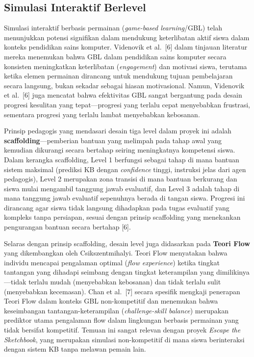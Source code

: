 \documentclass[12pt,oneside]{report}
\begin{document}
\subsection{Simulasi Interaktif Berlevel}
\label{subsec:simulasi-interaktif}

Simulasi interaktif berbasis permainan (\textit{game-based learning}/GBL) telah menunjukkan potensi signifikan dalam mendukung keterlibatan aktif siswa dalam konteks pendidikan sains komputer. Videnovik et al.\ [6] dalam tinjauan literatur mereka menemukan bahwa GBL dalam pendidikan sains komputer secara konsisten meningkatkan keterlibatan (\textit{engagement}) dan motivasi siswa, terutama ketika elemen permainan dirancang untuk mendukung tujuan pembelajaran secara langsung, bukan sekadar sebagai hiasan motivasional. Namun, Videnovik et al.\ [6] juga mencatat bahwa efektivitas GBL sangat bergantung pada desain progresi kesulitan yang tepat---progresi yang terlalu cepat menyebabkan frustrasi, sementara progresi yang terlalu lambat menyebabkan kebosanan.

Prinsip pedagogis yang mendasari desain tiga level dalam proyek ini adalah \textbf{scaffolding}---pemberian bantuan yang melimpah pada tahap awal yang kemudian dikurangi secara bertahap seiring meningkatnya kompetensi siswa. Dalam kerangka scaffolding, Level 1 berfungsi sebagai tahap di mana bantuan sistem maksimal (prediksi KB dengan \textit{confidence} tinggi, instruksi jelas dari agen pedagogis), Level 2 merupakan zona transisi di mana bantuan berkurang dan siswa mulai mengambil tanggung jawab evaluatif, dan Level 3 adalah tahap di mana tanggung jawab evaluatif sepenuhnya berada di tangan siswa. Progresi ini dirancang agar siswa tidak langsung dihadapkan pada tugas evaluatif yang kompleks tanpa persiapan, sesuai dengan prinsip scaffolding yang menekankan pengurangan bantuan secara bertahap [6].

Selaras dengan prinsip scaffolding, desain level juga didasarkan pada \textbf{Teori Flow} yang dikembangkan oleh Csikszentmihalyi. Teori Flow menyatakan bahwa individu mencapai pengalaman optimal (\textit{flow experience}) ketika tingkat tantangan yang dihadapi seimbang dengan tingkat keterampilan yang dimilikinya---tidak terlalu mudah (menyebabkan kebosanan) dan tidak terlalu sulit (menyebabkan kecemasan). Chan et al.\ [7] secara spesifik mengkaji penerapan Teori Flow dalam konteks GBL non-kompetitif dan menemukan bahwa keseimbangan tantangan-keterampilan (\textit{challenge-skill balance}) merupakan prediktor utama pengalaman flow dalam lingkungan berbasis permainan yang tidak bersifat kompetitif. Temuan ini sangat relevan dengan proyek \textit{Escape the Sketchbook}, yang merupakan simulasi non-kompetitif di mana siswa berinteraksi dengan sistem KB tanpa melawan pemain lain.
\end{document}
